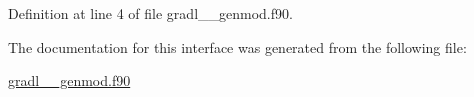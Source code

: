 Definition at line 4 of file gradl\+\_\+\+\_\+genmod.\+f90.



The documentation for this interface was generated from the following file\+:\begin{DoxyCompactItemize}
\item 
\hyperlink{gradl____genmod_8f90}{gradl\+\_\+\+\_\+genmod.\+f90}\end{DoxyCompactItemize}
